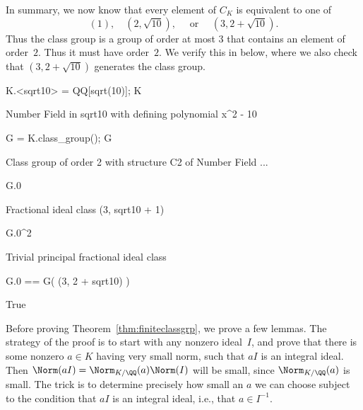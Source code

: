 \begin{example}
	In summary, we now know that every element of $C_K$ is equivalent to one of
	$$
	(1),\quad (2,\sqrt{10}), \quad \text{ or } \quad (3,2+\sqrt{10}).
	$$
	Thus the class group is a group of order at most $3$ that contains an
	element of order~$2$.  Thus it must have order~$2$.  We verify this in
	{\Sage} below, where we also check that $(3, 2+\sqrt{10})$ generates the
	class group.
	\begin{sagecode}
		\begin{sagecell}
			K.<sqrt10> = QQ[sqrt(10)]; K
		\end{sagecell}
		\begin{sageout}
			Number Field in sqrt10 with defining polynomial x^2 - 10
		\end{sageout}
		\begin{sagecell}
			G = K.class_group(); G
		\end{sagecell}
		\begin{sageout}
			Class group of order 2 with structure C2 of Number Field ...
		\end{sageout}
		\begin{sagecell}
			G.0
		\end{sagecell}
		\begin{sageout}
			Fractional ideal class (3, sqrt10 + 1)
		\end{sageout}
		\begin{sagecell}
			G.0^2
		\end{sagecell}
		\begin{sageout}
			Trivial principal fractional ideal class
		\end{sageout}
		\begin{sagecell}
			G.0 == G( (3, 2 + sqrt10) )
		\end{sagecell}
		\begin{sageout}
			True
		\end{sageout}
	\end{sagecode}
\end{example}

Before proving Theorem~\ref{thm:finiteclassgrp}, we prove a few
lemmas.  The strategy of the proof is to start with any nonzero
ideal~$I$, and prove that there is some nonzero $a\in K$ having very
small norm, such that $aI$ is an integral ideal. Then
$\Norm(aI)=\Norm_{K/\QQ}(a)\Norm(I)$ will be small, since
$\Norm_{K/\QQ}(a)$ is small.  The trick is to determine precisely
how small an $a$ we can choose subject to the condition that
$aI$ is an integral ideal, i.e., that $a\in I^{-1}$.


